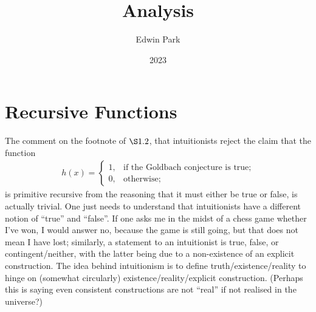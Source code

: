 \documentclass{article}
\title{Analysis}
\author{Edwin Park}
\date{2023}
\theoremstyle{definition}
\begin{document}
\clearpage\maketitle\thispagestyle{empty} %
\newpage
\tableofcontents
\newpage\setcounter{page}{1}

\section{Recursive Functions}
The comment on the footnote of $\S1.2$, that intuitionists reject the claim that the function
\begin{align*}
	h(x)=\begin{cases}
		1,&\text{if the Goldbach conjecture is true;}\\
		0,&\text{otherwise;}
	\end{cases}
\end{align*}
is primitive recursive from the reasoning that it must either be true or false, is actually trivial. One just needs to understand that intuitionists have a different notion of ``true'' and ``false''. If one asks me in the midst of a chess game whether I've won, I would answer no, because the game is still going, but that does not mean I have lost; similarly, a statement to an intuitionist is true, false, or contingent/neither, with the latter being due to a non-existence of an explicit construction. The idea behind intuitionism is to define truth/existence/reality to hinge on (somewhat circularly) existence/reality/explicit construction. (Perhaps this is saying even consistent constructions are not ``real'' if not realised in the universe?)
\end{document}
